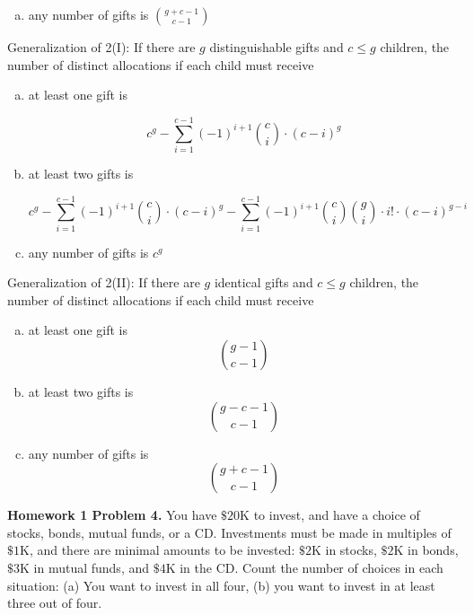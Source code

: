 \begin{enumerate}[(I)]
\begin{enumerate}[(a)]

\item any number of gifts is \(\binom{g + c - 1}{c - 1}\)

\end{enumerate}

Generalization of 2(I): If there are \(g\) distinguishable gifts and \(c \leq g\) children, the number of distinct allocations if each child must receive

\begin{enumerate}[(a)]

\item at least one gift is 

\[
c^g - \sum_{i = 1}^{c - 1} (-1)^{i+1} \binom{c}{i}\cdot(c - i)^g
\]

\item at least two gifts is

\[
c^g - \sum_{i = 1}^{c - 1} (-1)^{i+1} \binom{c}{i}\cdot(c - i)^g - \sum_{i = 1}^{c - 1} (-1)^{i+1} \binom{c}{i} \binom{g}{i} \cdot i! \cdot(c - i)^{g-i} 
\]

\item any number of gifts is \(c^g\)

\end{enumerate}

Generalization of 2(II): If there are \(g\) identical gifts and \(c \leq g\) children, the number of distinct allocations if each child must receive

\begin{enumerate}[(a)]

\item at least one gift is \[\binom{g - 1}{c - 1}\]

\item at least two gifts is \[\binom{g - c - 1}{c - 1}\]

\item any number of gifts is \[\binom{g + c - 1}{c - 1}\]

\end{enumerate}

\end{enumerate}

\textbf{Homework 1 Problem 4.} You have \(\$20\)K to invest, and have a choice of stocks, bonds, mutual funds, or a CD. Investments must be made in multiples of \(\$1\)K, and there are minimal amounts to be invested: \(\$2\)K in stocks, \(\$2\)K in bonds, \(\$3\)K in mutual funds, and \(\$4\)K in the CD. Count the number of choices in each situation: (a) You want to invest in all four, (b) you want to invest in at least three out of four.

